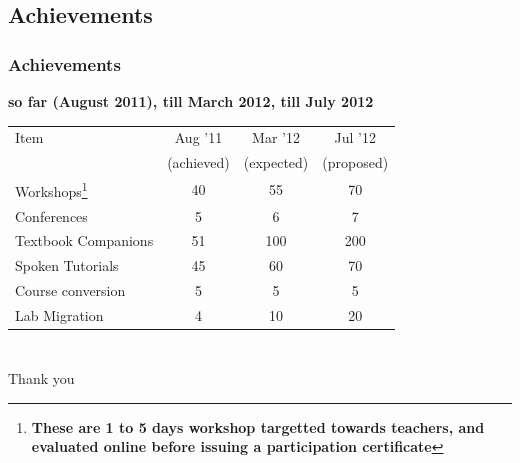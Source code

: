 \documentclass[compress,red]{beamer} %
\begin{document}
\subsection{Achievements}
\begin{frame}
\frametitle{Achievements}
\small \bf
{\bf so far (August 2011), till March 2012, till July 2012}
\begin{center}
\begin{table}[h]
\begin{tabular}{|l|c|c|c|}
\hline 
Item & Aug '11 & Mar '12 & Jul '12 \tabularnewline
& (achieved) & (expected) & (proposed) \tabularnewline
\hline
\hline 
Workshops\footnote{\bf These are 1 to 5 days workshop targetted towards
\alert{teachers}, and \alert{evaluated online} before issuing a participation
certificate}  & 40 &  55 & 70\tabularnewline
\hline 
Conferences & 5 & 6 & 7 \tabularnewline
\hline 
Textbook Companions & 51 & 100 & 200 \tabularnewline
\hline 
Spoken Tutorials & 45 & 60 & 70 \tabularnewline
\hline 
Course conversion & 5 & 5 & 5\tabularnewline
\hline
Lab Migration & 4 & 10 & 20 \tabularnewline
\hline
\end{tabular}
\end{table}
\end{center}
\end{frame}

\section*{}
\begin{frame}
    \begin{center}
        \huge
        Thank you\\ \pause
    \end{center}
\end{frame}
\end{document}
